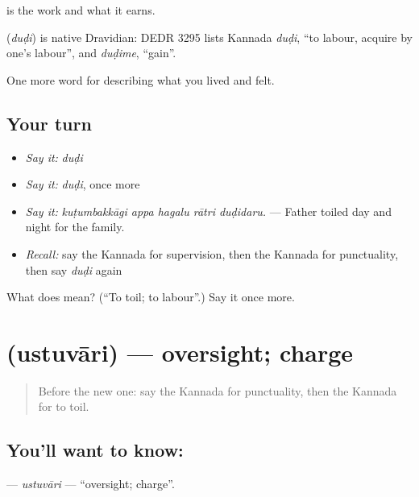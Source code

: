  is the work and what it earns.

\begin{cousinweb}
\textbf{} (\emph{duḍi}) is native Dravidian: DEDR 3295 lists Kannada \emph{duḍi}, \textquotedblleft{}to labour, acquire by one's labour\textquotedblright{}, and \emph{duḍime}, \textquotedblleft{}gain\textquotedblright{}.
\end{cousinweb}

\begin{grammarlens}[title={What you've built}]
One more word for describing what you lived and felt.
\end{grammarlens}

\subsection*{Your turn}
\begin{itemize}
\raggedright
  \item \emph{Say it:} \emph{duḍi}
  \item \emph{Say it:} \emph{duḍi}, once more
  \item \emph{Say it:} \emph{kuṭumbakkāgi appa hagalu rātri duḍidaru.} — Father toiled day and night for the family.
  \item \emph{Recall:} say the Kannada for supervision, then the Kannada for punctuality, then say \emph{duḍi} again
\end{itemize}

\begin{tcolorbox}[breakable,colback=teal!4,colframe=teal!35!black,title={Before you move on}]
What does  mean? (\textquotedblleft{}To toil; to labour\textquotedblright{}.) Say it once more.
\end{tcolorbox}
\section[\texorpdfstring{\kn{ಉಸ್ತುವಾರಿ} (ustuvāri)}{ಉಸ್ತುವಾರಿ (ustuvāri)}]{ (ustuvāri) — oversight; charge}

\label{lesson:KA-C521-ustuvari}



\begin{quote}
Before the new one: say the Kannada for punctuality, then the Kannada for to toil.
\end{quote}

\subsection*{You'll want to know: }
\textbf{} — \emph{ustuvāri} — \textquotedblleft{}oversight; charge\textquotedblright{}.

